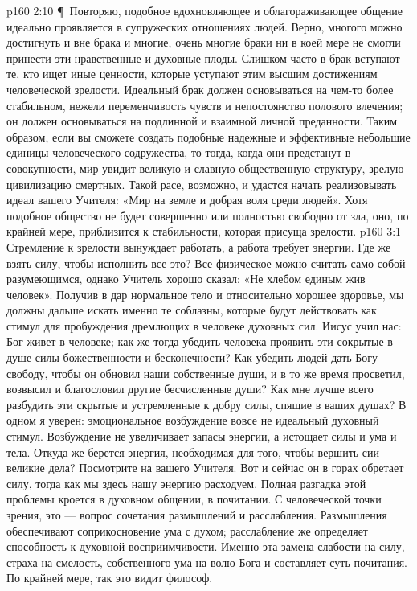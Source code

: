 \vs p160 2:10 \P\ Повторяю, подобное вдохновляющее и облагораживающее общение идеально проявляется в супружеских отношениях людей. Верно, многого можно достигнуть и вне брака и многие, очень многие браки ни в коей мере не смогли принести эти нравственные и духовные плоды. Слишком часто в брак вступают те, кто ищет иные ценности, которые уступают этим высшим достижениям человеческой зрелости. Идеальный брак должен основываться на чем\hyp{}то более стабильном, нежели переменчивость чувств и непостоянство полового влечения; он должен основываться на подлинной и взаимной личной преданности. Таким образом, если вы сможете создать подобные надежные и эффективные небольшие единицы человеческого содружества, то тогда, когда они предстанут в совокупности, мир увидит великую и славную общественную структуру, зрелую цивилизацию смертных. Такой расе, возможно, и удастся начать реализовывать идеал вашего Учителя: «Мир на земле и добрая воля среди людей». Хотя подобное общество не будет совершенно или полностью свободно от зла, оно, по крайней мере, приблизится к стабильности, которая присуща зрелости.
\vs p160 3:1 Стремление к зрелости вынуждает работать, а работа требует энергии. Где же взять силу, чтобы исполнить все это? Все физическое можно считать само собой разумеющимся, однако Учитель хорошо сказал: «Не хлебом единым жив человек». Получив в дар нормальное тело и относительно хорошее здоровье, мы должны дальше искать именно те соблазны, которые будут действовать как стимул для пробуждения дремлющих в человеке духовных сил. Иисус учил нас: Бог живет в человеке; как же тогда убедить человека проявить эти сокрытые в душе силы божественности и бесконечности? Как убедить людей дать Богу свободу, чтобы он обновил наши собственные души, и в то же время просветил, возвысил и благословил другие бесчисленные души? Как мне лучше всего разбудить эти скрытые и устремленные к добру силы, спящие в ваших душах? В одном я уверен: эмоциональное возбуждение вовсе не идеальный духовный стимул. Возбуждение не увеличивает запасы энергии, а истощает силы и ума и тела. Откуда же берется энергия, необходимая для того, чтобы вершить сии великие дела? Посмотрите на вашего Учителя. Вот и сейчас он в горах обретает силу, тогда как мы здесь нашу энергию расходуем. Полная разгадка этой проблемы кроется в духовном общении, в почитании. С человеческой точки зрения, это --- вопрос сочетания размышлений и расслабления. Размышления обеспечивают соприкосновение ума с духом; расслабление же определяет способность к духовной восприимчивости. Именно эта замена слабости на силу, страха на смелость, собственного ума на волю Бога и составляет суть почитания. По крайней мере, так это видит философ.
